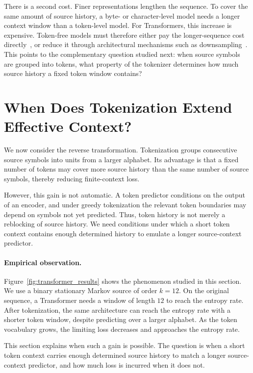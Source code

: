 \documentclass{article}
\theoremstyle{plain}
\theoremstyle{definition}
\theoremstyle{remark}
\begin{document}
There is a second cost.  Finer representations lengthen the sequence.  To
cover the same amount of source history, a byte- or character-level model
needs a longer context window than a token-level model.  For Transformers,
this increase is expensive.  Token-free models must therefore either pay the
longer-sequence cost directly~\citep{xueByT5TokenFreeFuture2022}, or reduce
it through architectural mechanisms such as
downsampling~\citep{clarkCaninePretrainingEfficient2022}.  This points to
the complementary question studied next: when source symbols are grouped
into tokens, what property of the tokenizer determines how much source
history a fixed token window contains?
    
  \section{When Does Tokenization Extend Effective Context?}
\label{sec:tokenization}

We now consider the reverse transformation.  Tokenization groups consecutive
source symbols into units from a larger alphabet.  Its advantage is that a
fixed number of tokens may cover more source history than the same number of
source symbols, thereby reducing finite-context loss.

However, this gain is not automatic.  A token predictor conditions on the output of
an encoder, and under greedy tokenization the relevant token boundaries may
depend on symbols not yet predicted.  Thus, token history is not merely a
reblocking of source history.  We need conditions under which a short token
context contains enough determined history to emulate a longer source-context
predictor.
    
  \paragraph{Empirical observation.}
Figure~\ref{fig:transformer_results} shows the phenomenon studied in this
section.  We use a binary stationary Markov source of order $k=12$.  On the
original sequence, a Transformer needs a window of length $12$ to reach the
entropy rate.  After tokenization, the same architecture can reach the entropy
rate with a shorter token window, despite predicting over a larger alphabet.
As the token vocabulary grows, the limiting loss decreases and approaches the
entropy rate.

This section explains when such a gain is possible.  The question is when a
short token context carries enough determined source history to match a
longer source-context predictor, and how much loss is incurred when it does
not.
    
\end{document}
